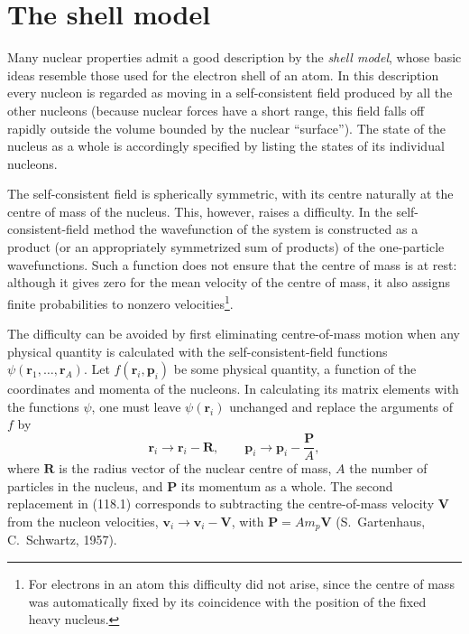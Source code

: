 \section{The shell model}

Many nuclear properties admit a good description by the \emph{shell model},
whose basic ideas resemble those used for the electron shell of an atom. In
this description every nucleon is regarded as moving in a self-consistent
field produced by all the other nucleons (because nuclear forces have a short
range, this field falls off rapidly outside the volume bounded by the nuclear
``surface''). The state of the nucleus as a whole is accordingly specified by
listing the states of its individual nucleons.

The self-consistent field is spherically symmetric, with its centre naturally
at the centre of mass of the nucleus. This, however, raises a difficulty. In
the self-consistent-field method the wavefunction of the system is constructed
as a product (or an appropriately symmetrized sum of products) of the
one-particle wavefunctions. Such a function does not ensure that the centre of
mass is at rest: although it gives zero for the mean velocity of the centre of
mass, it also assigns finite probabilities to nonzero velocities\footnote{For
electrons in an atom this difficulty did not arise, since the centre of mass
was automatically fixed by its coincidence with the position of the fixed
heavy nucleus.}.

The difficulty can be avoided by first eliminating centre-of-mass motion when
any physical quantity is calculated with the self-consistent-field functions
$\psi(\mathbf r_1,\ldots,\mathbf r_A)$. Let $f(\mathbf r_i,\mathbf p_i)$ be
some physical quantity, a function of the coordinates and momenta of the
nucleons. In calculating its matrix elements with the functions $\psi$, one
must leave $\psi(\mathbf r_i)$ unchanged and replace the arguments of $f$ by
\begin{equation}
 \mathbf r_i\to\mathbf r_i-\mathbf R,\qquad
 \mathbf p_i\to\mathbf p_i-\frac{\mathbf P}{A},
 \tag{118.1}
\end{equation}
where $\mathbf R$ is the radius vector of the nuclear centre of mass, $A$ the
number of particles in the nucleus, and $\mathbf P$ its momentum as a whole.
The second replacement in (118.1) corresponds to subtracting the
centre-of-mass velocity $\mathbf V$ from the nucleon velocities,
$\mathbf v_i\to\mathbf v_i-\mathbf V$, with
$\mathbf P=Am_p\mathbf V$ (S.~Gartenhaus, C.~Schwartz, 1957).

